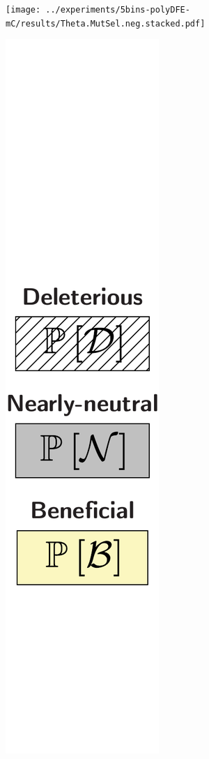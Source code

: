 \documentclass{article}
\begin{document}
\begin{center}
\begin{minipage}{0.09\linewidth}
        \end{minipage}
        \begin{minipage}{0.9\linewidth}
            \texttt{[image: ../experiments/5bins-polyDFE-mC/results/Theta.MutSel.neg.stacked.pdf]} \\
        \end{minipage}
        \begin{minipage}{0.09\linewidth}
            \includegraphics[width=\linewidth, page=1]{artworks/legend.polycat}

\end{minipage}
\end{center}
\end{document}
